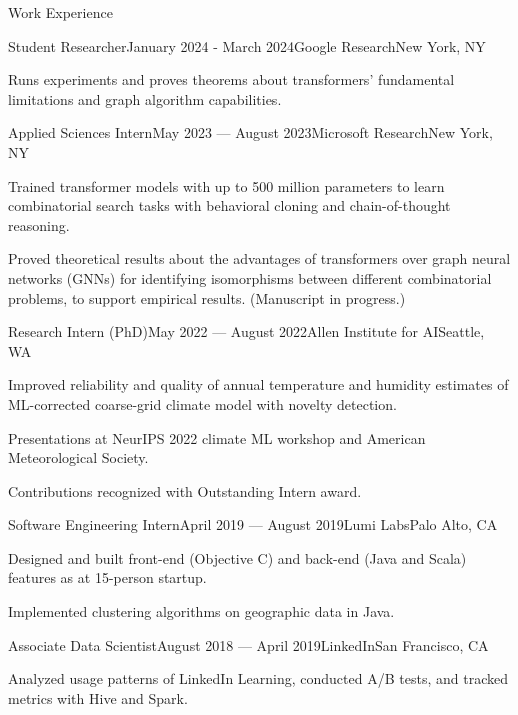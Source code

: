 \documentclass{resume} %
\begin{document}
\begin{rSection}{Work Experience}

\begin{rSubsection}{Student Researcher}{January 2024 - March 2024}{Google Research}{New York, NY}
\item Runs experiments and proves theorems about transformers' fundamental limitations and graph algorithm capabilities.
\end{rSubsection}

\begin{rSubsection}{Applied Sciences Intern}{May 2023 --- August 2023}{Microsoft Research}{New York, NY}
\item Trained transformer models with up to 500 million parameters to learn combinatorial search tasks with behavioral cloning and chain-of-thought reasoning.
\item Proved theoretical results about the advantages of transformers over graph neural networks (GNNs) for identifying isomorphisms between different combinatorial problems, to support empirical results. (Manuscript in progress.) 
\end{rSubsection}

\begin{rSubsection}{Research Intern (PhD)}{May 2022 --- August 2022}{Allen Institute for AI}{Seattle, WA}
\item Improved reliability and quality of annual temperature and humidity estimates of ML-corrected coarse-grid climate model with novelty detection.
\item Presentations at NeurIPS 2022 climate ML workshop and American Meteorological Society.
\item Contributions recognized with Outstanding Intern award.
\end{rSubsection}


\begin{rSubsection}{Software Engineering Intern}{April 2019 --- August 2019}{Lumi Labs}{Palo Alto, CA}
\item Designed and built front-end (Objective C) and back-end (Java and Scala) features as at 15-person startup.
\item Implemented clustering algorithms on geographic data in Java.
\end{rSubsection}

\begin{rSubsection}{Associate Data Scientist}{August 2018 --- April 2019}{LinkedIn}{San Francisco, CA}
\item Analyzed usage patterns of LinkedIn Learning, conducted A/B tests, and tracked metrics with Hive and Spark.
\end{rSubsection}
\end{rSection}
\end{document}
